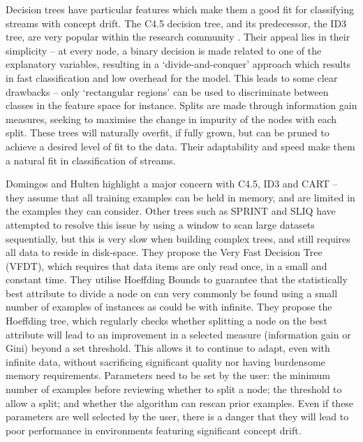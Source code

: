 \documentclass[10pt]{article}
\begin{document}
Decision trees have particular features which make them a good fit for classifying streams with concept drift. The C4.5 decision tree, and its predecessor, the ID3 tree, are very popular within the research community \cite{sal94}. Their appeal lies in their simplicity – at every node, a binary decision is made related to one of the explanatory variables, resulting in a ‘divide-and-conquer’ approach which results in fast classification and low overhead for the model. This leads to some clear drawbacks – only ‘rectangular regions’ can be used to discriminate between classes in the feature space for instance. Splits are made through information gain measures, seeking to maximise the change in impurity of the nodes with each split. These trees will naturally overfit, if fully grown, but can be pruned to achieve a desired level of fit to the data. Their adaptability and speed make them a natural fit in classification of streams.

Domingos and Hulten \cite{dom00} highlight a major concern with C4.5, ID3 and CART – they assume that all training examples can be held in memory, and are limited in the examples they can consider. Other trees such as SPRINT and SLIQ have attempted to resolve this issue by using a window to scan large datasets sequentially, but this is very slow when building complex trees, and still requires all data to reside in disk-space. They propose the Very Fast Decision Tree (VFDT), which requires that data items are only read once, in a small and constant time. They utilise Hoeffding Bounds \cite{hoe63} to guarantee that the statistically best attribute to divide a node on can very commonly be found using a small number of examples of instances as could be with infinite. They propose the Hoeffding tree, which regularly checks whether splitting a node on the best attribute will lead to an improvement in a selected measure (information gain or Gini) beyond a set threshold. This allows it to continue to adapt, even with infinite data, without sacrificing significant quality nor having burdensome memory requirements. Parameters need to be set by the user: the minimum number of examples before reviewing whether to split a node; the threshold to allow a split; and whether the algorithm can rescan prior examples. Even if these parameters are well selected by the user, there is a danger that they will lead to poor performance in environments featuring significant concept drift.
\end{document}
